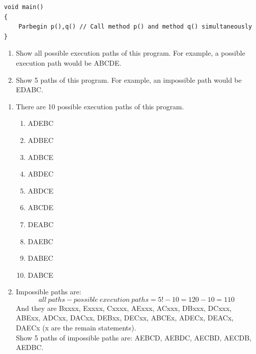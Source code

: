 \documentclass[12pt]{article}
\newenvironment{sol}[1][Solution]{\begin{trivlist}\item[\hskip\labelsep {\bfseries #1:}]}{\end{trivlist}}
\begin{document}
\begin{enumerate}
\begin{verbatim}
void main()
{
    Parbegin p(),q() // Call method p() and method q() simultaneously
}
\end{verbatim}
\begin{enumerate}
    \item Show all possible execution paths of this program. For example, a possible execution path would be ABCDE.
    \item Show 5 paths of this program. For example, an impossible path would be EDABC.
\end{enumerate}
\begin{sol}
\hspace*{\fill} 
\begin{enumerate}
\item There are 10 possible execution paths of this program.
\begin{enumerate}
    \item ADEBC
    \item ADBEC
    \item ADBCE
    \item ABDEC
    \item ABDCE
    \item ABCDE
    \item DEABC
    \item DAEBC
    \item DABEC
    \item DABCE
    
\end{enumerate}
\item Impossible paths are: 
$$all \ paths - possible \ execution \ paths = 5! - 10 = 120 - 10 = 110$$
And they are Bxxxx, Exxxx, Cxxxx, AExxx, ACxxx, DBxxx, DCxxx, ABExx, ADCxx, DACxx, DEBxx, DECxx, ABCEx, ADECx, DEACx, DAECx (x are the remain statements).\\ Show 5 paths of impossible paths are: AEBCD, AEBDC, AECBD, AECDB, AEDBC.
\end{enumerate}

\end{sol}


\end{enumerate}
\end{document}
